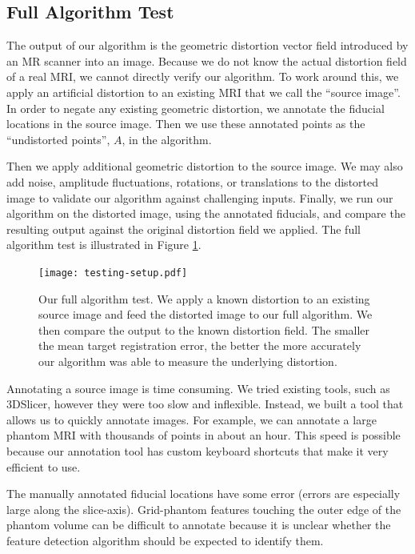 \documentclass[12pt]{article}
\begin{document}
\subsection{Full Algorithm Test}

The output of our algorithm is the geometric distortion vector field introduced by an MR scanner into an image.  Because we do not know the actual distortion field of a real MRI, we cannot directly verify our algorithm.  To work around this, we apply an artificial distortion to an existing MRI that we call the ``source image''.  In order to negate any existing geometric distortion, we annotate the fiducial locations in the source image.  Then we use these annotated points as the ``undistorted points'', $A$, in the algorithm.

Then we apply additional geometric distortion to the source image.  We may also add noise, amplitude fluctuations, rotations, or translations to the distorted image to validate our algorithm against challenging inputs.  Finally, we run our algorithm on the distorted image, using the annotated fiducials, and compare the resulting output against the original distortion field we applied.  The full algorithm test is illustrated in Figure \ref{fig:testing-setup}.

\begin{figure}
    \centering
    \texttt{[image: testing-setup.pdf]}
    \caption{Our full algorithm test.  We apply a known distortion to an existing source image and feed the distorted image to our full algorithm.  We then compare the output to the known distortion field.  The smaller the mean target registration error, the better the more accurately our algorithm was able to measure the underlying distortion.}
    \label{fig:testing-setup}
\end{figure}

Annotating a source image is time consuming.  We tried existing tools, such as 3DSlicer, however they were too slow and inflexible.  Instead, we built a tool that allows us to quickly annotate images.  For example, we can annotate a large phantom MRI with thousands of points in about an hour.  This speed is possible because our annotation tool has custom keyboard shortcuts that make it very efficient to use.

The manually annotated fiducial locations have some error (errors are especially large along the slice-axis).  Grid-phantom features touching the outer edge of the phantom volume can be difficult to annotate because it is unclear whether the feature detection algorithm should be expected to identify them.
\end{document}
